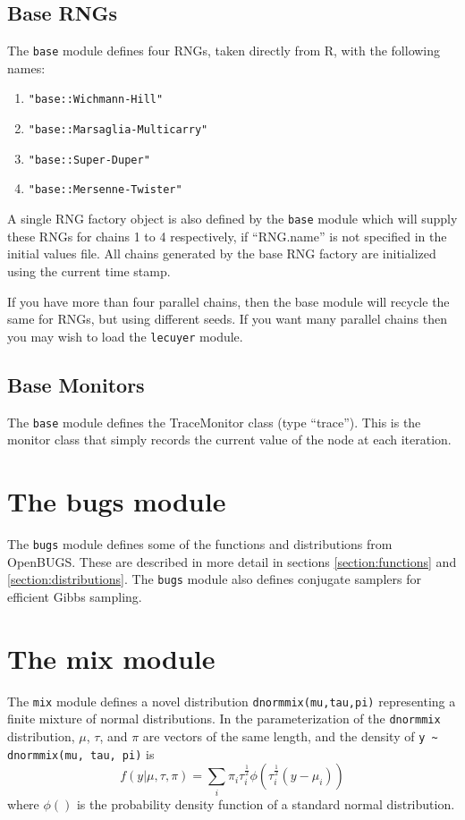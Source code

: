 \documentclass[11pt, a4paper, titlepage]{report}
\newcommand{\OpenBUGS}{\textsf{OpenBUGS}}
\newcommand{\R}{\textsf{R}}
\begin{document}
\subsection{Base RNGs}

The \verb+base+ module defines four RNGs, taken directly from \R,
with the following names:
\begin{enumerate}
\item \verb+"base::Wichmann-Hill"+
\item \verb+"base::Marsaglia-Multicarry"+
\item \verb+"base::Super-Duper"+
\item \verb+"base::Mersenne-Twister"+
\end{enumerate}

A single RNG factory object is also defined by the \verb+base+
module which will supply these RNGs for chains 1 to 4 respectively, if
``RNG.name'' is not specified in the initial values file.  All chains
generated by the base RNG factory are initialized using the current
time stamp.

If you have more than four parallel chains, then the base module will
recycle the same for RNGs, but using different seeds. If you want many
parallel chains then you may wish to load the \verb+lecuyer+ module.

\subsection{Base Monitors}

The \verb+base+ module defines the TraceMonitor class (type
``trace''). This is the monitor class that simply records the current
value of the node at each iteration.

\section{The bugs module}

The \verb+bugs+ module defines some of the functions and distributions
from \OpenBUGS. These are described in more detail in sections
\ref{section:functions} and \ref{section:distributions}.  The
\verb+bugs+ module also defines conjugate samplers for efficient Gibbs
sampling.

\section{The mix module}

The \verb+mix+ module defines a novel distribution
\verb+dnormmix(mu,tau,pi)+ representing a finite mixture of normal
distributions. In the parameterization of the \verb+dnormmix+
distribution, $\mu$, $\tau$, and $\pi$ are vectors of the same length,
and the density of \verb+y ~ dnormmix(mu, tau, pi)+ is
\[
f(y | \mu, \tau, \pi) = \sum_i \pi_i \tau_i^{\frac{1}{2}} \phi( \tau^{\frac{1}{2}}_i (y - \mu_i))
\]
where $\phi()$ is the probability density function of a standard
normal distribution.
\end{document}
